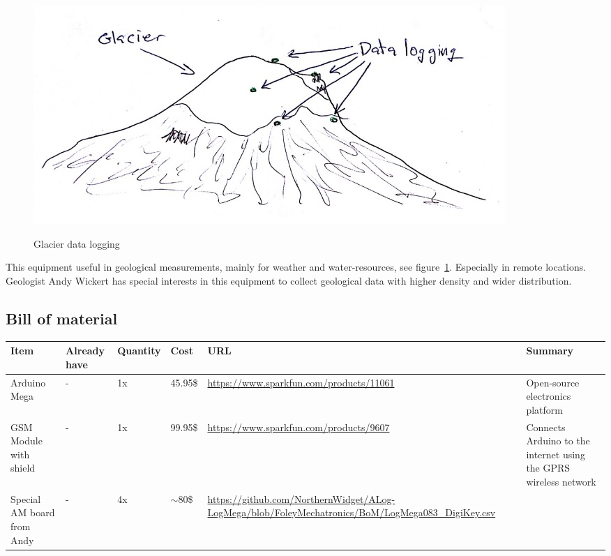 \documentclass[12pt,a4paper,titlepage]{article}
\begin{document}
\begin{figure}
\centering
\includegraphics[width=0.7\linewidth]{graphics/Logging}
\caption{Glacier data logging}
\label{fig:glacier}\cite{Helgason_glacier}
\end{figure}

 This equipment useful in geological measurements, mainly for weather and water-resources, see figure~\ref*{fig:glacier}. Especially in remote locations. 
 Geologist Andy Wickert has special interests in this equipment to collect geological data with higher density and wider distribution. 
 


\subsection{Bill of material} %
\begin{center}
    \begin{tabular}{ | p{1.5cm} | p{1.4cm} | p{1.5cm} | l | p{5cm} | p{5cm} |}
    \hline
    Item & Already have & Quantity & Cost & URL & Summary \\ \hline
    
    Arduino Mega & - & 1x & 45.95\$ & \url{https://www.sparkfun.com/products/11061} & Open-source electronics platform \\ \hline
    
    GSM Module with shield & - & 1x & 99.95\$ & \url{https://www.sparkfun.com/products/9607} & Connects Arduino to the internet using the GPRS wireless network \\ \hline
    
	Special AM board from Andy & - & 4x & $\sim$80\$ & \url{https://github.com/NorthernWidget/ALog-LogMega/blob/FoleyMechatronics/BoM/LogMega083_DigiKey.csv} &  \\ \hline
    \end{tabular}
\end{center}
 



\end{document}
